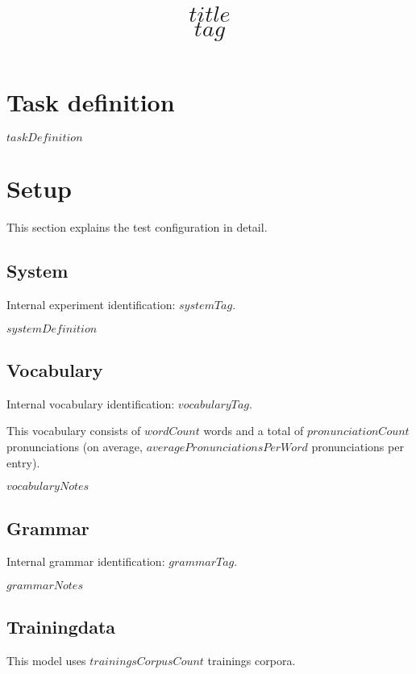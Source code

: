 \documentclass[a4paper,10pt,bibtotoc]{scrartcl}
\title{$title$\\$tag$}
\begin{document}
\maketitle

\begin{multicols}{2}

\tableofcontents


\section{Task definition}
$taskDefinition$

\section{Setup}
\label{sec:Setup}

This section explains the test configuration in detail.

\subsection{System}
\label{sec:System}

Internal experiment identification: $systemTag$.

$systemDefinition$

\subsection{Vocabulary}

Internal vocabulary identification: $vocabularyTag$.

This vocabulary consists of $wordCount$ words and a total of $pronunciationCount$ pronunciations (on average, $averagePronunciationsPerWord$ pronunciations per entry).

$vocabularyNotes$

\subsection{Grammar}

Internal grammar identification: $grammarTag$.

$grammarNotes$

\subsection{Trainingdata}

This model uses $trainingsCorpusCount$ trainings corpora.


\end{multicols}
\end{document}
